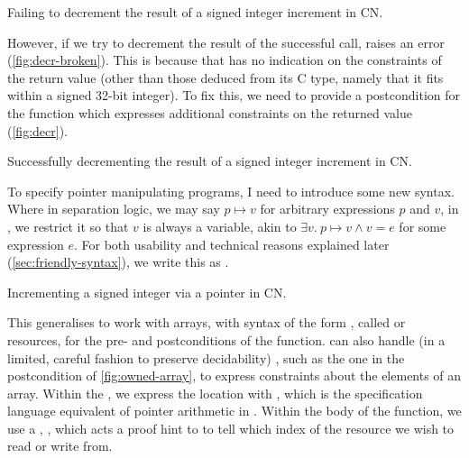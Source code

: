 \begin{marginfigure}
    \centering
    \caption{Failing to decrement the result of a signed integer increment in
        CN.}\label{fig:decr-broken}
\end{marginfigure}

However, if we try to decrement the result of the successful call, 
raises an error (\cref{fig:decr-broken}). This is because that  has no
indication on the constraints of the return value (other than those deduced
from its C type, namely that it fits within a signed 32-bit integer). To fix
this, we need to provide a postcondition for the function which
expresses additional constraints on the returned value (\cref{fig:decr}).

\begin{marginfigure}
    \centering
    \caption{Successfully decrementing the result of a signed integer increment
        in CN.}\label{fig:decr}
\end{marginfigure}

To specify pointer manipulating programs, I need to introduce some new syntax.
Where in separation logic, we may say $p \mapsto v$ for arbitrary expressions
$p$ and $v$, in , we restrict it so that $v$ is always a variable, akin
to $\exists{} v.\ p \mapsto v \wedge v = e$ for some expression $e$. For both
usability and technical reasons explained later (\cref{sec:friendly-syntax}), we
write this as . %

\begin{marginfigure}
    \centering
    \caption{Incrementing a signed integer via a pointer in CN.}\label{fig:owned-incr}
\end{marginfigure}

This generalises to work with arrays, with syntax of the form
, %
called  or  resources, for the pre- and
postconditions of the function.  can also handle (in a limited, careful
fashion to preserve decidability) , such as the
one in the postcondition of \cref{fig:owned-array}, to express constraints
about the elements of an array. Within the , we express the
location with , which is the specification language %
equivalent of pointer arithmetic in . Within the body of the
function, we use a , ,
which acts a proof hint to  to tell which index of the 
resource we wish to read or write from.

